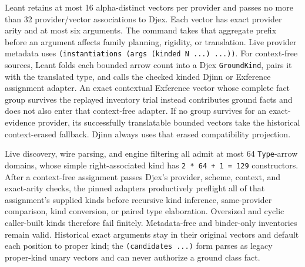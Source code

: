 \documentclass[11pt,oneside]{article}
\newcommand{\code}[1]{\texttt{#1}}
\begin{document}
Leant retains at most 16 alpha-distinct vectors per provider and passes no more
than 32 provider/vector associations to Djex. Each vector has exact provider
arity and at most six arguments. The command takes that aggregate prefix
before an argument affects family planning, rigidity, or translation. Live
provider metadata uses
\code{(instantiations (args (kinded N ...) ...))}. For context-free sources,
Leant folds each bounded arrow count into a Djex \code{GroundKind}, pairs it
with the translated type, and calls the checked kinded Djinn or Exference
assignment adapter. An exact contextual Exference vector whose complete fact
group survives the replayed inventory trial instead contributes ground facts
and does not also enter that context-free adapter. If no group survives for an
exact-evidence provider, its successfully translatable bounded vectors take
the historical context-erased fallback. Djinn always uses that erased
compatibility projection.

Live discovery, wire parsing, and engine filtering all admit at most 64
\code{Type}-arrow domains, whose simple right-associated kind has
\code{2 * 64 + 1 = 129} constructors. After a context-free assignment passes
Djex's provider, scheme, context, and exact-arity checks, the pinned adapters
productively preflight all of that assignment's supplied kinds before
recursive kind inference, same-provider comparison, kind conversion, or
paired type elaboration. Oversized and cyclic caller-built kinds therefore
fail finitely. Metadata-free and binder-only inventories remain valid.
Historical exact arguments stay in their original vectors and default each
position to proper kind; the \code{(candidates ...)} form parses as legacy
proper-kind unary vectors and can never authorize a ground class fact.
\end{document}
